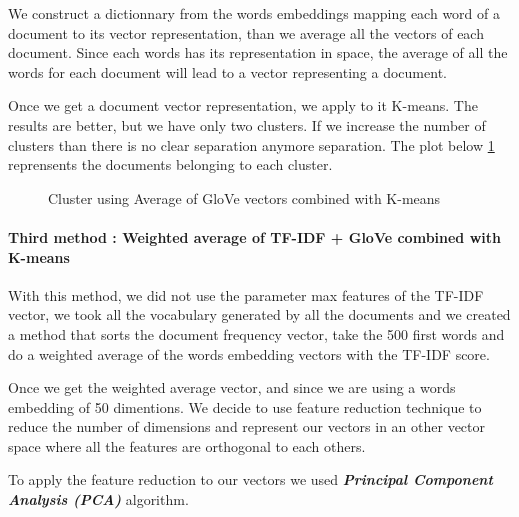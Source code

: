 \documentclass[article,twocolumn]{IEEEtran}
\begin{document}
We construct a dictionnary from the words embeddings mapping each word
of a document to its vector representation, than we average all the
vectors of each document. Since each words has its representation in
space, the average of all the words for each document will lead to a
vector representing a document.

Once we get a document vector representation, we apply to it K-means.
The results are better, but we have only two clusters. If we increase
the number of clusters than there is no clear separation anymore
separation. The plot below \ref{fig4} reprensents the documents
belonging to each cluster.


    \begin{figure}
        \begin{center}\end{center}
        \caption{Cluster using Average of GloVe vectors combined with K-means }
        \label{fig4}
    \end{figure}
    
    \hypertarget{third-method-weighted-average-of-tf-idf-glove-combined-with-k-means}{%
\paragraph{Third method : Weighted average of TF-IDF + GloVe combined
with
K-means}\label{third-method-weighted-average-of-tf-idf-glove-combined-with-k-means}}

With this method, we did not use the parameter max features of the
TF-IDF vector, we took all the vocabulary generated by all the documents
and we created a method that sorts the document frequency vector, take
the 500 first words and do a weighted average of the words embedding
vectors with the TF-IDF score.

Once we get the weighted average vector, and since we are using a words
embedding of 50 dimentions. We decide to use feature reduction technique
to reduce the number of dimensions and represent our vectors in an other
vector space where all the features are orthogonal to each others.

To apply the feature reduction to our vectors we used
\textbf{\emph{Principal Component Analysis (PCA)}} algorithm.
\end{document}
